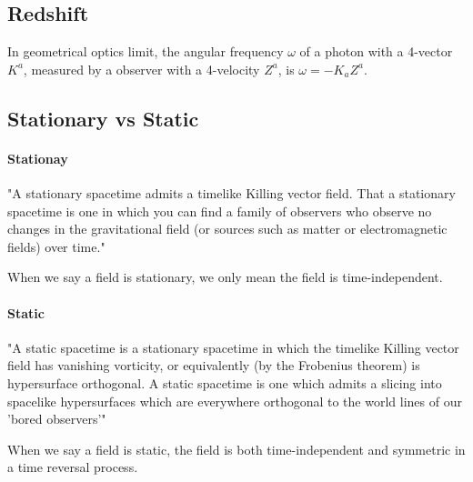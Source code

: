 \documentclass[12pt,a4paper]{book}
\begin{document}
\subsection{Redshift}

In geometrical optics limit, the angular frequency $\omega$ of a photon with a 4-vector $K^a$, measured by a observer with a 4-velocity $Z^a$, is $\omega=-K_aZ^a$.

\subsection{Stationary vs Static}

\paragraph{Stationay}
"A stationary spacetime admits a timelike Killing vector field. That a stationary spacetime is one in which you can find a family of observers who observe no changes in the gravitational field (or sources such as matter or electromagnetic fields) over time."

When we say a field is stationary, we only mean the field is time-independent.

\paragraph{Static}
"A static spacetime is a stationary spacetime in which the timelike Killing vector field has vanishing vorticity, or equivalently (by the Frobenius theorem) is hypersurface orthogonal. A static spacetime is one which admits a slicing into spacelike hypersurfaces which are everywhere orthogonal to the world lines of our 'bored observers'"

When we say a field is static, the field is both time-independent and symmetric in a time reversal process.
\end{document}
